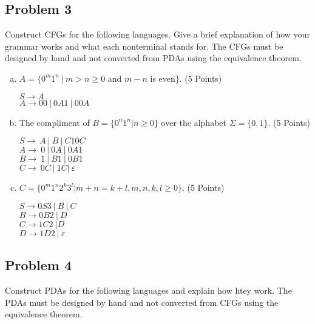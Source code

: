 \documentclass{article}
\begin{document}
\newpage


\subsection*{Problem 3}
Construct CFGs for the following languages. Give a brief explanation of how your
grammar works and what each nonterminal stands for. The CFGs must be designed
by hand and not converted from PDAs using the equivalence theorem.

\begin{enumerate}[(a)]
\item $A = \{0^m1^n\ |\ m > n \geq 0$ and $ m - n$ is even$\}$. (5 Points)

$S \rightarrow A$ \\
$A \rightarrow 00\ |\ 0A1\ |\ 00A $\\


\item The compliment of $B = \{0^n1^n | n \geq 0\}$ over the alphabet $\Sigma = \{0,1\}$. (5 Points)

$S \rightarrow\ A\ |\ B\ |\ C10C $ \\
$A \rightarrow\ 0\ |\ 0A\ |\ 0A1 $ \\
$B \rightarrow\ 1\ |\ B1\ |\ 0B1 $ \\
$C \rightarrow\ 0C\ |\ 1C |\ \varepsilon $


\item $C = \{0^m1^n2^k3^l | m+n=k+l, m,n,k,l \geq 0\}$. (5 Points)

$S \rightarrow 0S3\ |\ B\ |\ C $ \\
$B \rightarrow 0B2\ |\ D $ \\
$C \rightarrow 1C2\ | D $ \\
$D \rightarrow 1D2\ |\ \varepsilon$

\end{enumerate}

\newpage


\subsection*{Problem 4}
Construct PDAs for the following languages and explain how htey work. The PDAs must be designed by hand and
not converted from CFGs using the equivalence theorem.
\end{document}
